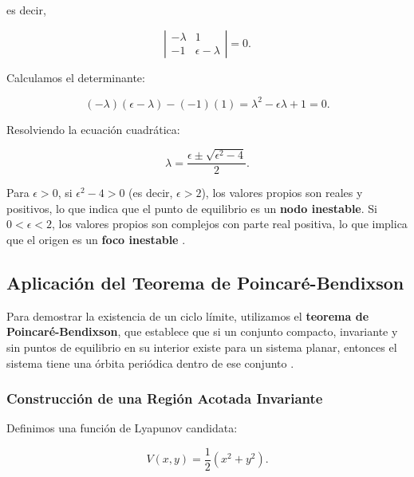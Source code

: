 es decir,

\begin{equation}
    \left| \begin{array}{cc}
        -\lambda & 1 \\
        -1 & \epsilon - \lambda
    \end{array} \right| = 0.
\end{equation}

Calculamos el determinante:

\begin{equation}
    (-\lambda)(\epsilon - \lambda) - (-1)(1) = \lambda^2 - \epsilon \lambda + 1 = 0.
\end{equation}

Resolviendo la ecuación cuadrática:

\begin{equation}
    \lambda = \frac{\epsilon \pm \sqrt{\epsilon^2 - 4}}{2}.
\end{equation}

Para \(\epsilon > 0\), si \(\epsilon^2 - 4 > 0\) (es decir, \(\epsilon > 2\)), los valores propios son reales y positivos, lo que indica que el punto de equilibrio es un \textbf{nodo inestable}. Si \(0 < \epsilon < 2\), los valores propios son complejos con parte real positiva, lo que implica que el origen es un \textbf{foco inestable} \cite{guckenheimer1983nonlinear}.

\subsection*{Aplicación del Teorema de Poincaré-Bendixson}

Para demostrar la existencia de un ciclo límite, utilizamos el \textbf{teorema de Poincaré-Bendixson}, que establece que si un conjunto compacto, invariante y sin puntos de equilibrio en su interior existe para un sistema planar, entonces el sistema tiene una órbita periódica dentro de ese conjunto \cite{wiggins2003introduction}.

\subsubsection{Construcción de una Región Acotada Invariante}

Definimos una función de Lyapunov candidata:

\begin{equation}
    V(x, y) = \dfrac{1}{2} \left( x^2 + y^2 \right).
\end{equation}

